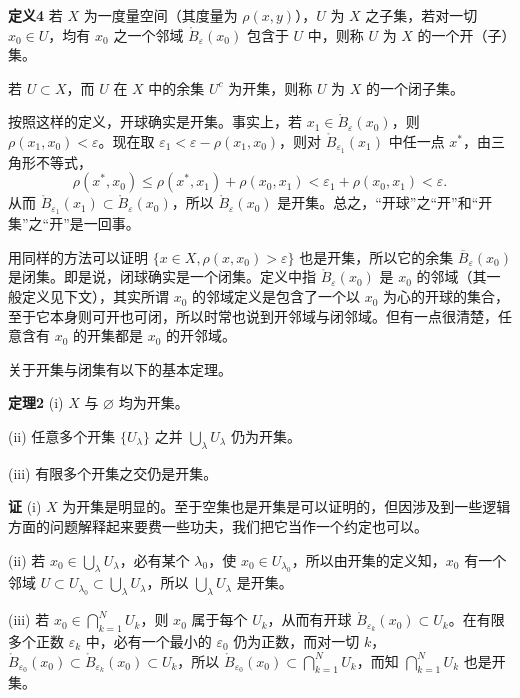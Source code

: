 \noindent\textbf{定义4}\quad
若 $X$ 为一度量空间（其度量为 $\rho(x,y)$），$U$ 为 $X$ 之子集，若对一切 $x_0\in U$，均有 $x_0$ 之一个邻域 $\mathring B_\varepsilon(x_0)$ 包含于 $U$ 中，则称 $U$ 为 $X$ 的一个开（子）集。

若 $U\subset X$，而 $U$ 在 $X$ 中的余集 $U^c$ 为开集，则称 $U$ 为 $X$ 的一个闭子集。

按照这样的定义，开球确实是开集。事实上，若 $x_1\in\mathring B_\varepsilon(x_0)$，则 $\rho(x_1,x_0)<\varepsilon$。现在取 $\varepsilon_1<\varepsilon-\rho(x_1,x_0)$，则对 $\mathring B_{\varepsilon_1}(x_1)$ 中任一点 $x^*$，由三角形不等式，
\[
 \rho(x^*,x_0)\le\rho(x^*,x_1)+\rho(x_0,x_1)<\varepsilon_1+\rho(x_0,x_1)<\varepsilon.
\]
从而 $\mathring B_{\varepsilon_1}(x_1)\subset\mathring B_\varepsilon(x_0)$，所以 $\mathring B_\varepsilon(x_0)$ 是开集。总之，“开球”之“开”和“开集”之“开”是一回事。

用同样的方法可以证明 $\{x\in X,\rho(x,x_0)>\varepsilon\}$ 也是开集，所以它的余集 $\overline B_\varepsilon(x_0)$ 是闭集。即是说，闭球确实是一个闭集。定义中指 $\mathring B_\varepsilon(x_0)$ 是 $x_0$ 的邻域（其一般定义见下文），其实所谓 $x_0$ 的邻域定义是包含了一个以 $x_0$ 为心的开球的集合，至于它本身则可开也可闭，所以时常也说到开邻域与闭邻域。但有一点很清楚，任意含有 $x_0$ 的开集都是 $x_0$ 的开邻域。

关于开集与闭集有以下的基本定理。

\noindent\textbf{定理2}\quad
(i) $X$ 与 $\varnothing$ 均为开集。

(ii) 任意多个开集 $\{U_\lambda\}$ 之并 $\bigcup_\lambda U_\lambda$ 仍为开集。

(iii) 有限多个开集之交仍是开集。

\noindent\textbf{证}\quad
(i) $X$ 为开集是明显的。至于空集也是开集是可以证明的，但因涉及到一些逻辑方面的问题解释起来要费一些功夫，我们把它当作一个约定也可以。

(ii) 若 $x_0\in\bigcup_\lambda U_\lambda$，必有某个 $\lambda_0$，使 $x_0\in U_{\lambda_0}$，所以由开集的定义知，$x_0$ 有一个邻域 $U\subset U_{\lambda_0}\subset\bigcup_\lambda U_\lambda$，所以 $\bigcup_\lambda U_\lambda$ 是开集。

(iii) 若 $x_0\in\bigcap_{k=1}^N U_k$，则 $x_0$ 属于每个 $U_k$，从而有开球 $\mathring B_{\varepsilon_k}(x_0)\subset U_k$。在有限多个正数 $\varepsilon_k$ 中，必有一个最小的 $\varepsilon_0$ 仍为正数，而对一切 $k$，$\mathring B_{\varepsilon_0}(x_0)\subset\mathring B_{\varepsilon_k}(x_0)\subset U_k$，所以 $\mathring B_{\varepsilon_0}(x_0)\subset\bigcap_{k=1}^N U_k$，而知 $\bigcap_{k=1}^N U_k$ 也是开集。

